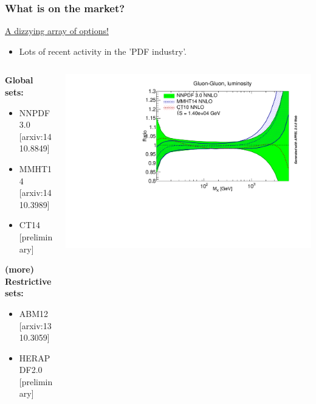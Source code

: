 \documentclass[10pt]{beamer}
\begin{document}

\begin{frame}
\frametitle{What is on the market?}
\small \underline{A dizzying array of options!} \\
\begin{itemize}
\item Lots of recent activity in the 'PDF industry'.
\end{itemize}

\vskip10pt

\begin{columns}
\begin{column}{0.4\textwidth}
\small \textbf{Global sets:} \\
\begin{itemize}
\item NNPDF3.0 \small{  \color{lavendar} [arxiv:1410.8849]}
\item MMHT14 \small{  \color{lavendar} [arxiv:1410.3989]}
\item CT14 \small{  \color{lavendar} [preliminary]}
\end{itemize}

\small \textbf{(more) Restrictive sets:} \\
\begin{itemize}
\item ABM12 \small{  \color{lavendar} [arxiv:1310.3059]}
\item HERAPDF2.0 \small{  \color{lavendar} [preliminary]}
\end{itemize}\end{column}

	\begin{column}{0.6\textwidth}
	\includegraphics[width=\textwidth]{figures/LumiJob3.pdf}
	\end{column}
	
	
\end{columns}






\end{frame}
\end{document}
